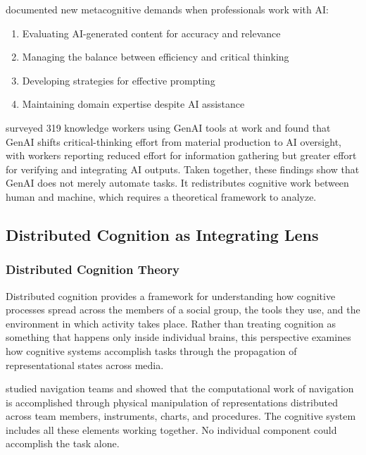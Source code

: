 \textcite{tankelevitch_metacognitive_2024} documented new metacognitive demands
when professionals work with AI:

\begin{enumerate}
      \item Evaluating AI-generated content for accuracy and relevance
      \item Managing the balance between efficiency and critical thinking
      \item Developing strategies for effective prompting
      \item Maintaining domain expertise despite AI assistance
\end{enumerate}

\textcite{lee_impact_2025} surveyed 319 knowledge workers using GenAI tools at
work and found that GenAI shifts critical-thinking effort from material
production to AI oversight, with workers reporting reduced effort for
information gathering but greater effort for verifying and integrating AI
outputs. Taken together, these findings show that GenAI does not merely
automate tasks. It redistributes cognitive work between human and machine,
which requires a theoretical framework to analyze.

\subsection{Distributed Cognition as Integrating Lens}\label{subsec:distributed-cognition}

\subsubsection{Distributed Cognition Theory}

Distributed cognition \parencite{hutchins_cognition_1995} provides a framework
for understanding how cognitive processes spread across the members of a social
group, the tools they use, and the environment in which activity takes place.
Rather than treating cognition as something that happens only inside individual
brains, this perspective examines how cognitive systems accomplish tasks through
the propagation of representational states across media.

\textcite{hutchins_cognition_1995} studied navigation teams and showed that the
computational work of navigation is accomplished through physical manipulation
of representations distributed across team members, instruments, charts, and
procedures. The cognitive system includes all these elements working together.
No individual component could accomplish the task alone.

